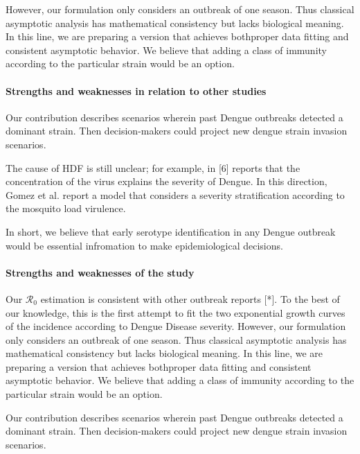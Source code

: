         However, our formulation only considers an outbreak of one season.
    Thus classical asymptotic analysis has mathematical consistency
    but lacks biological meaning.  In this line, we are preparing a
    version that achieves both\textemdash proper data fitting and consistent
    asymptotic behavior. We believe that adding a class of immunity
    according to the particular strain would be an option.

    \paragraph{Strengths and weaknesses in relation 
        to other studies}
        
        Our contribution describes scenarios wherein past Dengue outbreaks
    detected a dominant strain. Then decision-makers could project new
    dengue strain invasion scenarios.

        The cause of HDF is still unclear; for example, in [6] reports that
    the concentration of the virus explains the severity of Dengue. In
    this direction, Gomez et al. report a model that considers a severity
    stratification according to the mosquito load virulence.

        In short, we believe that early serotype identification in any Dengue
    outbreak would be essential infromation to make epidemiological decisions.
    \paragraph{Strengths and weaknesses of the study} 
        Our $\mathcal{R}_0$ estimation is consistent with other outbreak reports [*].
    To the best of our knowledge, this is the first attempt to fit the 
    two exponential growth curves of the incidence according to Dengue 
    Disease severity. However, our formulation only considers an outbreak
    of one season. Thus classical asymptotic analysis has mathematical 
    consistency but lacks biological meaning.  In this line, we are preparing
    a version that achieves both\textemdash proper data fitting and consistent
    asymptotic behavior. We believe that adding a class of immunity according
    to the particular strain would be an option.

        Our contribution describes scenarios wherein past Dengue
    outbreaks detected a dominant  strain. Then decision-makers could
    project new dengue strain invasion scenarios.
     
